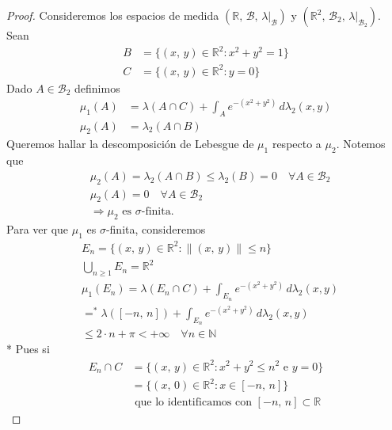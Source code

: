 \documentclass[12pt]{article}
\begin{document}
\begin{proof}
    Consideremos los espacios de medida \( (\mathbb{R}\text{, }\mathcal{B}\text{, }\lambda|_{\mathcal{B}}) \) y \( (\mathbb{R}^2\text{, }\mathcal{B}_2\text{, }\lambda|_{\mathcal{B}_2})  \).
    Sean\begin{align*}
        B & = \{ (x \text{, } y) \in \mathbb{R}^2 : x^2 + y^2 = 1 \} \\
        C & = \{ (x \text{, } y) \in \mathbb{R}^2 : y = 0 \}
    \end{align*}
    Dado \( A \in \mathcal{B}_2  \) definimos\begin{align*}
        \mu_1(A) & = \lambda(A \cap C) + \int_A e^{-(x^2 + y^2)} \, d\lambda_2(x, y) \\
        \mu_2(A) & = \lambda_2(A \cap B)
    \end{align*}
    Queremos hallar la descomposición de Lebesgue de \( \mu_1  \) respecto a \( \mu_2  \). Notemos que \begin{align*}
         & \mu_2(A) = \lambda_2(A \cap B) \leq \lambda_2(B) = 0 \quad \forall A \in \mathcal{B}_2 \\
         & \mu_2(A) = 0 \quad \forall A \in \mathcal{B}_2                                         \\
         & \Rightarrow \mu_2 \text{ es } \sigma\text{-finita.}
    \end{align*}
    Para ver que \( \mu_1  \) es \( \sigma  \)-finita, consideremos \begin{align*}
        & E_n = \{  (x\text{, }y) \in \mathbb{R}^2 : \| (x\text{, } y) \| \leq n \} \\
        & \bigcup_{n \geq 1} E_n = \mathbb{R}^2 \\
        & \mu_1(E_n) = \lambda(E_n \cap C) + \int_{E_n} e^{-(x^2 + y^2)} \, d\lambda_2(x, y) \\
        & =^* \lambda([-n\text{, }n]) + \int_{E_n} e^{-(x^2 + y^2)} \, d\lambda_2(x, y) \\
        & \leq 2 \cdot n + \pi < +\infty \quad \forall n \in \mathbb{N}
    \end{align*}
    * Pues si\begin{align*}
        E_n \cap C & = \{ (x\text{, }y) \in \mathbb{R}^2 : x^2 + y^2 \leq n^2 \text{ e } y = 0\} \\
        & = \{ (x\text{, }0) \in \mathbb{R}^2 : x \in [-n\text{, }n] \} \\
        & \text{  que lo identificamos con } [-n\text{, }n] \subset \mathbb{R}
    \end{align*}

\end{proof}
\end{document}

